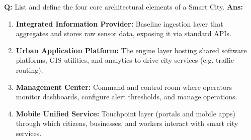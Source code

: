 \documentclass[10pt,a4paper,twocolumn]{article}
\begin{document}
\begin{tcolorbox}[
  colback=white,
  colframe=UnitColorTen,
  colbacktitle=gray!10!white,
  coltitle=black,
  fonttitle=\bfseries\sffamily\small,
  title={Unit X $\bullet$ Card 11},
  boxrule=1.2pt,
  arc=2mm,
  outer arc=2mm,
  boxsep=1.5mm,
  top=1mm,
  bottom=1mm,
  left=1.5mm,
  right=1.5mm,
  before skip=2.5mm,
  after skip=2.5mm
]
\textbf{Q:} List and define the four core architectural elements of a Smart City.
\tcbline
\textbf{Ans:} \begin{enumerate}
  \item \textbf{Integrated Information Provider:} Baseline ingestion layer that aggregates and stores raw sensor data, exposing it via standard APIs.
  \item \textbf{Urban Application Platform:} The engine layer hosting shared software platforms, GIS utilities, and analytics to drive city services (e.g. traffic routing).
  \item \textbf{Management Center:} Command and control room where operators monitor dashboards, configure alert thresholds, and manage operations.
  \item \textbf{Mobile Unified Service:} Touchpoint layer (portals and mobile apps) through which citizens, businesses, and workers interact with smart city services.
\end{enumerate}
\end{tcolorbox}
\end{document}
